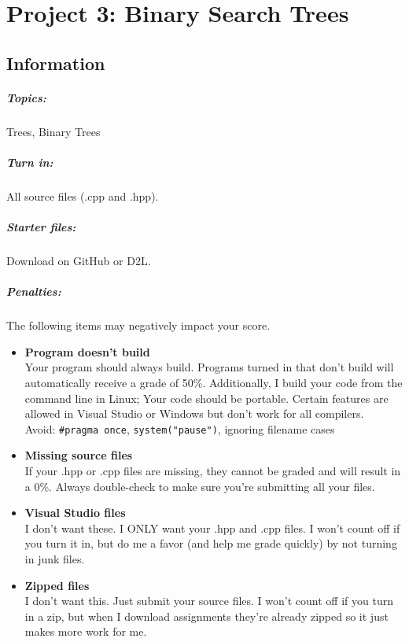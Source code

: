 \documentclass[a4paper,12pt,oneside]{book}
\title{}
\author{Rachel Morris}
\date{\today}
\newcommand{\laLab}{Project 3: Binary Search Trees\ }
\begin{document}
    \chapter*{\laLab} 

        \section{Information}
            \paragraph{ Topics: } Trees, Binary Trees
            \paragraph{ Turn in: } All source files (.cpp and .hpp).
            \paragraph{ Starter files: } Download on GitHub or D2L.

            \paragraph{ Penalties: }
                The following items may negatively impact your score.

                \begin{itemize}
                    \item   \textbf{Program doesn't build}
                        \\ Your program should always build. Programs turned in that don't build will automatically receive a grade of 50\%.{}
                            Additionally, I build your code from the command line in Linux; Your code should be portable. Certain features
                            are allowed in Visual Studio or Windows but don't work for all compilers. \\
                            \footnotesize Avoid: \texttt{\#pragma once}, \texttt{system("pause")}, ignoring filename cases
                            \normalsize 
                    \item   \textbf{Missing source files}
                        \\ If your .hpp or .cpp files are missing, they cannot be graded and will result in a 0\%. Always double-check to make sure you're submitting all your files.
                    \item   \textbf{Visual Studio files}
                        \\ I don't want these. I ONLY want your .hpp and .cpp files. I won't count off if you turn it in, but do me a favor (and help me grade quickly) by not turning in junk files.
                    \item   \textbf{Zipped files}
                        \\ I don't want this. Just submit your source files. I won't count off if you turn in a zip, but when I download assignments they're already zipped so it just makes more work for me.
                \end{itemize}
                
\end{document}
